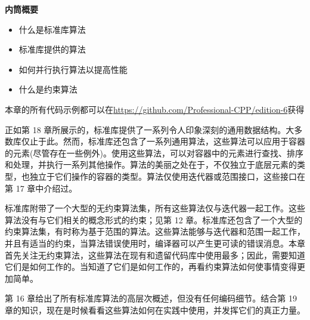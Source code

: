\noindent
\textbf{内筒概要}

\begin{itemize}
\item
什么是标准库算法

\item
标准库提供的算法

\item
如何并行执行算法以提高性能

\item
什么是约束算法
\end{itemize}

本章的所有代码示例都可以在\url{https://github.com/Professional-CPP/edition-6}获得

正如第 18 章所展示的，标准库提供了一系列令人印象深刻的通用数据结构。大多数库仅止于此。然而，标准库还包含了一系列通用算法，这些算法可以应用于容器的元素(尽管存在一些例外)。使用这些算法，可以对容器中的元素进行查找、排序和处理，并执行一系列其他操作。算法的美丽之处在于，不仅独立于底层元素的类型，也独立于它们操作的容器的类型。算法仅使用迭代器或范围接口，这些接口在第 17 章中介绍过。

标准库附带了一个大型的无约束算法集，所有这些算法仅与迭代器一起工作。这些算法没有与它们相关的概念形式的约束；见第 12 章。标准库还包含了一个大型的约束算法集，有时称为基于范围的算法。这些算法能够与迭代器和范围一起工作，并且有适当的约束，当算法错误使用时，编译器可以产生更可读的错误消息。本章首先关注无约束算法，这些算法在现有和遗留代码库中使用最多；因此，需要知道它们是如何工作的。当知道了它们是如何工作的，再看约束算法如何使事情变得更加简单。

第 16 章给出了所有标准库算法的高层次概述，但没有任何编码细节。结合第 19 章的知识，现在是时候看看这些算法如何在实践中使用，并发挥它们的真正力量。
